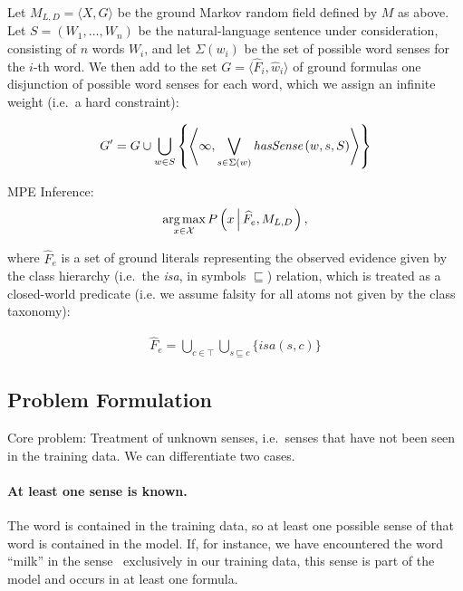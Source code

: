 \documentclass[12pt,a4paper]{article}
\newcommand{\lsym}{\textit}
\DeclareMathOperator*{\argmax}{\text{arg\,max}}
\begin{document}
Let $M_{L,D} = \langle X, G \rangle$ be the ground Markov random 
field defined by $M$ as above. Let $S=(W_1, \ldots,W_n)$ be the 
natural-language sentence under consideration, consisting of $n$ 
words $W_i$, and let $\Sigma(w_i)$ be the set of possible word 
senses for the $i$-th word. We then add to the set 
$G=\langle\widehat{F}_i, \widehat{w}_i\rangle$ of ground formulas 
one disjunction of possible word senses for each word, which we 
assign an infinite weight (i.e.\ a hard constraint):

\begin{eqnarray}
	G' = G\cup\bigcup_{w\in S}\left\{\left<\infty,\bigvee_{s\in\Sigma(w)}\textit{hasSense\,}(w,s,S)\right>\right\}\label{eq:sensedisjunction}
\end{eqnarray}

MPE Inference:
\begin{eqnarray}
	\argmax_{x\in\mathcal{X}}P\left(x\left|\,\widehat{F}_e,M_{L,D}\right.\right),\label{eq:mpe-inference}
\end{eqnarray}

where $\widehat{F}_e$ is a set of ground literals representing the 
observed evidence given by the class hierarchy (i.e.\ the \textit
{isa}, in symbols $\sqsubseteq$) relation, which is treated as a 
closed-world predicate (i.e. we assume falsity for all atoms not 
given by the class taxonomy):

\begin{eqnarray}
	\widehat{F}_e=\bigcup_{c\in\top}\bigcup_{s\sqsubseteq c}\{\textit{isa}(s,c)\}
\end{eqnarray}
 
\subsection{Problem Formulation}

Core problem: Treatment of unknown senses, i.e.\ senses that have 
not been seen in the training data. We can differentiate two cases. 

\paragraph{At least one sense is known.} The word is contained in 
the training data, so at least one possible sense of that word is 
contained in the model. If, for instance, we have encountered the 
word ``milk'' in the sense \FruitJuice\ exclusively in our training 
data, this sense is part of the model and occurs in at least one 
formula.
 
\end{document}
